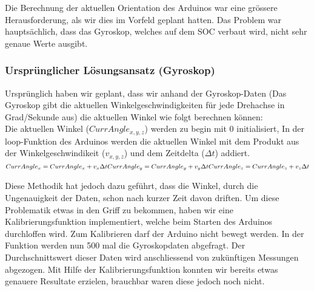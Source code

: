 
Die Berechnung der aktuellen Orientation des Arduinos war eine grössere Herausforderung,
als wir dies im Vorfeld geplant hatten. Das Problem war hauptsächlich, dass das Gyroskop, welches auf dem SOC verbaut wird, nicht sehr genaue Werte ausgibt.

\subsubsection{Ursprünglicher Lösungsansatz (Gyroskop)}
Ursprünglich haben wir geplant, dass wir anhand der Gyroskop-Daten 
(Das Gyroskop gibt die aktuellen Winkelgeschwindigkeiten für jede Drehachse in Grad/Sekunde aus) 
die aktuellen Winkel wie folgt berechnen können:\\

Die aktuellen Winkel (\begin{math}CurrAngle_{x,y,z}\end{math}) werden zu begin mit 0 initialisiert, In der loop-Funktion des Arduinos werden die aktuellen Winkel mit dem Produkt aus der Winkelgeschwindikeit (\begin{math}v_{x,y,z}\end{math}) und dem Zeitdelta (\begin{math}\Delta{t}\end{math}) addiert.\\

\begin{math}
  CurrAngle_x = CurrAngle_x + v_x \Delta t  \\
  CurrAngle_y = CurrAngle_y + v_y \Delta t  \\
  CurrAngle_z = CurrAngle_z + v_z \Delta t  \\
\end{math}

Diese Methodik hat jedoch dazu geführt, dass die Winkel, durch die Ungenauigkeit der Daten, schon nach kurzer Zeit davon driften.
Um diese Problematik etwas in den Griff zu bekommen, haben wir eine Kalibrierungsfunktion implementiert, welche beim Starten des Arduinos durchloffen wird.
Zum Kalibrieren darf der Arduino nicht bewegt werden. In der Funktion werden nun 500 mal die Gyroskopdaten abgefragt.
Der Durchschnittswert dieser Daten wird anschliessend von zukünftigen Messungen abgezogen.
Mit Hilfe der Kalibrierungsfunktion konnten wir bereits etwas genauere Resultate erzielen, brauchbar waren diese jedoch  noch nicht.


